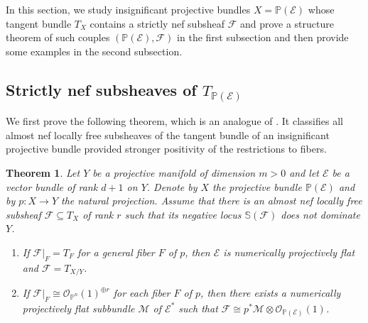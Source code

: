 \documentclass[english,reqno]{amsart}
\newcommand\bbP{{\mathbb P}}
\newcommand\bbS{{\mathbb S}}
\newcommand\sE{{\mathscr E}}
\newcommand\sF{{\mathscr F}}
\newcommand\sM{{\mathscr M}}
\newcommand\sO{{\mathscr O}}
\theoremstyle{plain}
\newtheorem{thm}{Theorem}[section]
\theoremstyle{definition}
\numberwithin{equation}{section} %
\begin{document}
In this section, we   study insignificant projective bundles $X=\mathbb{P}(\sE)$ whose tangent bundle $T_X$ contains a strictly nef subsheaf $\sF$ and prove a structure theorem of such couples $(\mathbb{P}(\sE), \sF)$ in the first subsection and then provide some examples  in the second subsection.






\subsection{Strictly nef subsheaves of $T_{\mathbb{P}(\sE)}$}

We first  prove the following theorem, which is an analogue of \cite[Lemma 1.2]{CampanaPeternell1998}. It classifies all almost nef locally free subsheaves of the tangent bundle of an insignificant projective bundle provided stronger positivity of the restrictions to fibers.




\begin{thm}
    \label{Proj-bundle}
    Let $Y$ be a projective manifold of dimension $m>0$ and let $\sE$ be a vector bundle of rank $d+1$ on $Y$. Denote by $X$ the projective bundle $\bbP(\sE)$ and by $p\colon X\rightarrow Y$ the natural projection.
    Assume that there is an almost nef locally free   subsheaf $\sF \subseteq T_{X}$ of rank $r$ such that its negative locus $\bbS(\sF)$ does not dominate $Y$.
    \begin{enumerate}
        \item If $\sF\vert_F=T_F$ for a general fiber $F$ of $p$, then $\sE$ is numerically projectively flat  and $\sF=T_{X/Y}$.

        \item If $\sF\vert_F\cong  \sO_{\bbP^n}(1)^{\oplus r}$ for each fiber $F$ of $p$, then there exists a numerically projectively flat subbundle $\sM$ of $\sE^*$ such that $\sF\cong  p^*\sM\otimes\sO_{\bbP(\sE)}(1)$.
    \end{enumerate}
\end{thm}
\end{document}
